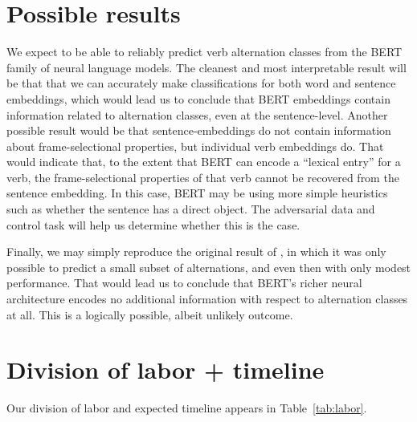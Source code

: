 \documentclass[11pt]{article}
\begin{document}
\section{Possible results}
We expect to be able to reliably predict verb alternation classes from the BERT family of neural language models.  The cleanest and most interpretable result will be that that we can accurately make classifications for both word and sentence embeddings, which would lead us to conclude that BERT embeddings contain information related to alternation classes, even at the sentence-level.  Another possible result would be that sentence-embeddings do not contain information about frame-selectional properties, but individual verb embeddings do.  That would indicate that, to the extent that BERT can encode a ``lexical entry'' for a verb, the frame-selectional properties of that verb cannot be recovered from the sentence embedding. In this case, BERT may be using more simple heuristics such as whether the sentence has a direct object. The adversarial data and control task will help us determine whether this is the case.

Finally, we may simply reproduce the original result of \citealt{kann-etal-2019-verb}, in which it was only possible to predict a small subset of alternations, and even then with only modest performance.  That would lead us to conclude that BERT's richer neural architecture encodes no additional information with respect to alternation classes at all.  This is a logically possible, albeit unlikely outcome.

%


\section{Division of labor + timeline}
Our division of labor and expected timeline appears in Table~\ref{tab:labor}.



\end{document}
